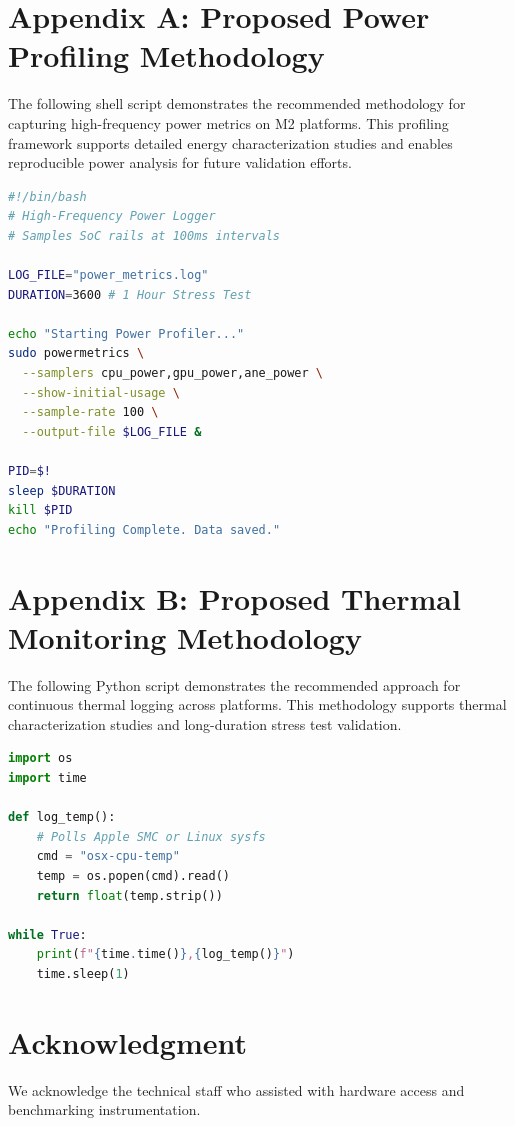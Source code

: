 \documentclass[conference]{IEEEtran}
\begin{document}
\section*{Appendix A: Proposed Power Profiling Methodology}
The following shell script demonstrates the recommended methodology for capturing high-frequency power metrics on M2 platforms. This profiling framework supports detailed energy characterization studies and enables reproducible power analysis for future validation efforts.

\begin{lstlisting}[language=bash, caption=M2 Power Profiler (Proposed Validation Tool)]
#!/bin/bash
# High-Frequency Power Logger
# Samples SoC rails at 100ms intervals

LOG_FILE="power_metrics.log"
DURATION=3600 # 1 Hour Stress Test

echo "Starting Power Profiler..."
sudo powermetrics \
  --samplers cpu_power,gpu_power,ane_power \
  --show-initial-usage \
  --sample-rate 100 \
  --output-file $LOG_FILE &

PID=$!
sleep $DURATION
kill $PID
echo "Profiling Complete. Data saved."
\end{lstlisting}

\section*{Appendix B: Proposed Thermal Monitoring Methodology}
The following Python script demonstrates the recommended approach for continuous thermal logging across platforms. This methodology supports thermal characterization studies and long-duration stress test validation.

\begin{lstlisting}[language=python, caption=Thermal Logger (Proposed Validation Tool)]
import os
import time

def log_temp():
    # Polls Apple SMC or Linux sysfs
    cmd = "osx-cpu-temp" 
    temp = os.popen(cmd).read()
    return float(temp.strip())

while True:
    print(f"{time.time()},{log_temp()}")
    time.sleep(1)
\end{lstlisting}

\section*{Acknowledgment}
We acknowledge the technical staff who assisted with hardware access and benchmarking instrumentation.
\end{document}
